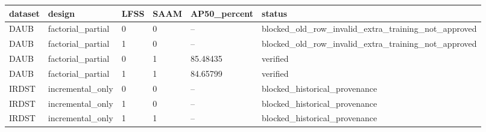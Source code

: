 \begin{tabular}{llllll}
\hline
dataset & design & LFSS & SAAM & AP50\_percent & status \\
\hline
DAUB & factorial\_partial & 0 & 0 & -- & blocked\_old\_row\_invalid\_extra\_training\_not\_approved \\
DAUB & factorial\_partial & 1 & 0 & -- & blocked\_old\_row\_invalid\_extra\_training\_not\_approved \\
DAUB & factorial\_partial & 0 & 1 & 85.48435 & verified \\
DAUB & factorial\_partial & 1 & 1 & 84.65799 & verified \\
IRDST & incremental\_only & 0 & 0 & -- & blocked\_historical\_provenance \\
IRDST & incremental\_only & 1 & 0 & -- & blocked\_historical\_provenance \\
IRDST & incremental\_only & 1 & 1 & -- & blocked\_historical\_provenance \\
\hline
\end{tabular}
